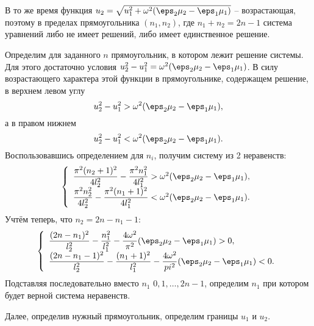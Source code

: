 \documentclass[12pt]{hedsemwork}
\renewcommand{\frac}{\dfrac}
\begin{document}
\begin{appendix}
В то же время функция
\( u_2 = \sqrt{u_1^2 + \omega^2(\eps_2\mu_2 - \eps_1\mu_1)} \) -- возрастающая,
поэтому в пределах прямоугольника \( (n_1, n_2) \), где \( n_1 + n_2 = 2n -1 \)
система уравнений либо не имеет решений, либо имеет единственное решение.

Определим для заданного \( n \) прямоугольник, в котором лежит решение системы.
Для этого достаточно условия
\( u_2^2 - u_1^2 = \omega^2(\eps_2\mu_2 - \eps_1\mu_1) \). В силу возрастающего
характера этой функции в прямоугольнике, содержащем решение, в верхнем левом
углу
\[
    u_2^2 - u_1^2 > \omega^2(\eps_2\mu_2 - \eps_1\mu_1),
\]
а в правом нижнем
\[
    u_2^2 - u_1^2 < \omega^2(\eps_2\mu_2 - \eps_1\mu_1).
\]
Воспользовавшись определением для \( n_i \), получим систему из 2 неравенств:
\[
    \left\{
        \begin{array}{l}
            \frac{\pi^2(n_2+1)^2}{4l_2^2} - \frac{\pi^2n_1^2}{4l_1^2} >
            \omega^2(\eps_2\mu_2 - \eps_1\mu_1),\\
            \frac{\pi^2n_2^2}{4l_2^2} - \frac{\pi^2(n_1+1)^2}{4l_1^2} <
            \omega^2(\eps_2\mu_2 - \eps_1\mu_1).
        \end{array}
    \right.
\]
Учтём теперь, что \( n_2 = 2n - n_1 -1 \):
\[
    \left\{
        \begin{array}{l}
            \frac{(2n - n_1)^2}{l_2^2} - \frac{n_1^2}{l_1^2} -
            \frac{4\omega^2}{\pi^2}(\eps_2\mu_2 - \eps_1\mu_1) > 0,\\
            \frac{(2n - n_1 -1)^2}{l_2^2} - \frac{(n_1+1)^2}{l_1^2} -
            \frac{4\omega^2}{pi^2}(\eps_2\mu_2 - \eps_1\mu_1) < 0.
        \end{array}
    \right.
\]
Подставляя последовательно вместо \( n_1 \) \( 0, 1, \ldots, 2n - 1 \),
определим \( n_1 \) при котором будет верной система неравенств.

Далее, определив нужный прямоугольник, определим границы \( u_1 \) и \( u_2 \).

\end{appendix}
\end{document}
